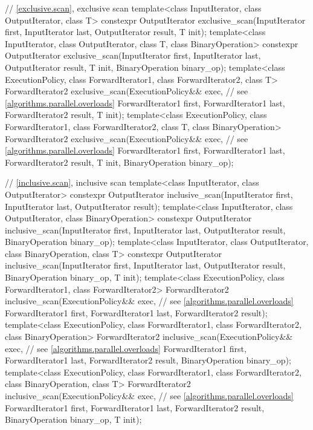\begin{codeblock}
{  // \ref{exclusive.scan}, exclusive scan
  template<class InputIterator, class OutputIterator, class T>
    constexpr OutputIterator
      exclusive_scan(InputIterator first, InputIterator last,
                     OutputIterator result, T init);
  template<class InputIterator, class OutputIterator, class T, class BinaryOperation>
    constexpr OutputIterator
      exclusive_scan(InputIterator first, InputIterator last,
                     OutputIterator result, T init, BinaryOperation binary_op);
  template<class ExecutionPolicy, class ForwardIterator1, class ForwardIterator2, class T>
    ForwardIterator2
      exclusive_scan(ExecutionPolicy&& exec,                    // see \ref{algorithms.parallel.overloads}
                     ForwardIterator1 first, ForwardIterator1 last,
                     ForwardIterator2 result, T init);
  template<class ExecutionPolicy, class ForwardIterator1, class ForwardIterator2, class T,
           class BinaryOperation>
    ForwardIterator2
      exclusive_scan(ExecutionPolicy&& exec,                    // see \ref{algorithms.parallel.overloads}
                     ForwardIterator1 first, ForwardIterator1 last,
                     ForwardIterator2 result, T init, BinaryOperation binary_op);

  // \ref{inclusive.scan}, inclusive scan
  template<class InputIterator, class OutputIterator>
    constexpr OutputIterator
      inclusive_scan(InputIterator first, InputIterator last,
                     OutputIterator result);
  template<class InputIterator, class OutputIterator, class BinaryOperation>
    constexpr OutputIterator
      inclusive_scan(InputIterator first, InputIterator last,
                     OutputIterator result, BinaryOperation binary_op);
  template<class InputIterator, class OutputIterator, class BinaryOperation, class T>
    constexpr OutputIterator
      inclusive_scan(InputIterator first, InputIterator last,
                     OutputIterator result, BinaryOperation binary_op, T init);
  template<class ExecutionPolicy, class ForwardIterator1, class ForwardIterator2>
    ForwardIterator2
      inclusive_scan(ExecutionPolicy&& exec,                    // see \ref{algorithms.parallel.overloads}
                     ForwardIterator1 first, ForwardIterator1 last,
                     ForwardIterator2 result);
  template<class ExecutionPolicy, class ForwardIterator1, class ForwardIterator2,
           class BinaryOperation>
    ForwardIterator2
      inclusive_scan(ExecutionPolicy&& exec,                    // see \ref{algorithms.parallel.overloads}
                     ForwardIterator1 first, ForwardIterator1 last,
                     ForwardIterator2 result, BinaryOperation binary_op);
  template<class ExecutionPolicy, class ForwardIterator1, class ForwardIterator2,
           class BinaryOperation, class T>
    ForwardIterator2
      inclusive_scan(ExecutionPolicy&& exec,                    // see \ref{algorithms.parallel.overloads}
                     ForwardIterator1 first, ForwardIterator1 last,
                     ForwardIterator2 result, BinaryOperation binary_op, T init);

}
\end{codeblock}
